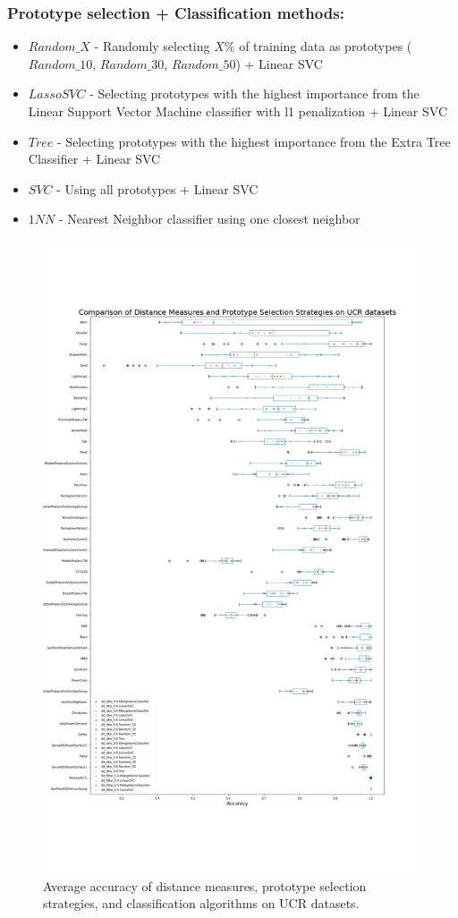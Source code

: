 \subsubsection*{Prototype selection + Classification methods:}
\begin{itemize}
    \item $Random\_X$ - Randomly selecting $X\%$ of training data as prototypes ($Random\_10$, $Random\_30$, $Random\_50$) + Linear SVC
    \item $LassoSVC$ - Selecting prototypes with the highest importance from the Linear Support Vector Machine classifier with l1 penalization + Linear SVC
    \item $Tree$ - Selecting prototypes with the highest importance from the Extra Tree Classifier + Linear SVC
    \item $SVC$ - Using all prototypes + Linear SVC
    \item $1NN$ - Nearest Neighbor classifier using one closest neighbor
\end{itemize}
\begin{figure}[h]
    \centering
    \includegraphics[width=\textwidth]{img/ucr_accuracy.png}
    \caption{Average accuracy of distance measures, prototype selection strategies, and classification algorithms on UCR datasets.}
    \label{app:results-datasets}
\end{figure}
